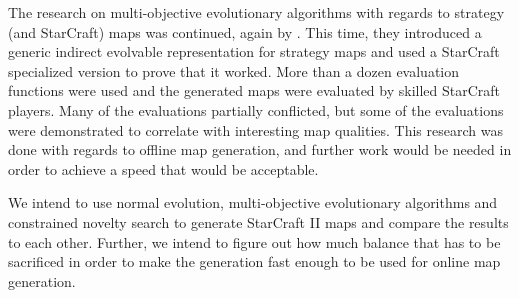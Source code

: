 The research on multi-objective evolutionary algorithms with regards to strategy (and StarCraft) maps was continued, again by \citeauthor{Togelius2013Controllable}\cite{Togelius2013Controllable}. This time, they introduced a generic indirect evolvable representation for strategy maps and used a StarCraft specialized version to prove that it worked. More than a dozen evaluation functions were used and the generated maps were evaluated by skilled StarCraft players. Many of the evaluations partially conflicted, but some of the evaluations were demonstrated to correlate with interesting map qualities. This research was done with regards to offline map generation, and further work would be needed in order to achieve a speed that would be acceptable.

We intend to use normal evolution, multi-objective evolutionary algorithms and constrained novelty search to generate StarCraft II maps and compare the results to each other. Further, we intend to figure out how much balance that has to be sacrificed in order to make the generation fast enough to be used for online map generation.